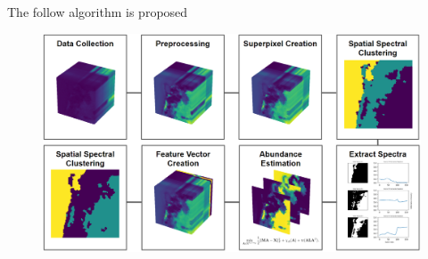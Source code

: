 The follow algorithm is proposed

\begin{figure}[h]
    \centering %
    \includegraphics[scale=0.33]{algorithm_view.png}  %
    \label{fig:label}  %
  \end{figure}
  